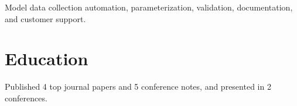\documentclass[letterpaper]{deedy-resume-openfont}
\begin{document}
\begin{tightemize}
\item Model data collection automation, parameterization, validation, documentation, and customer support.

\end{tightemize}
\sectionsep





\section{Education} 

\begin{tightemize}
\item Published 4 top journal papers and 5 conference notes, and presented in 2 conferences.
\end{tightemize}
\sectionsep
\end{document}
